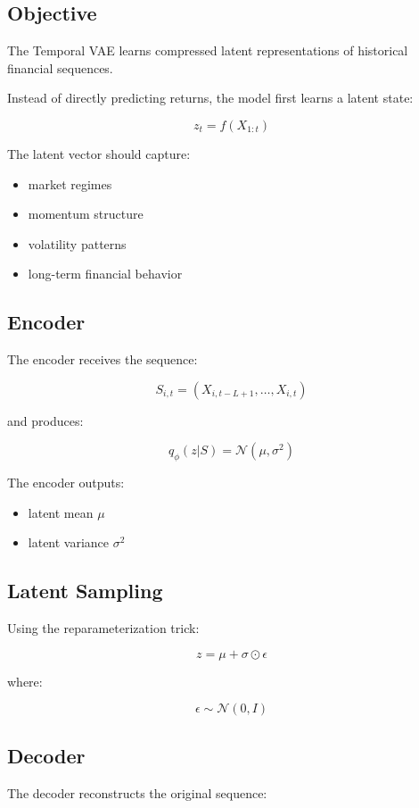 \documentclass[11pt]{article}
\begin{document}
\subsection{Objective}

The Temporal VAE learns compressed latent representations of historical financial sequences.

Instead of directly predicting returns, the model first learns a latent state:

\[
z_t
=
f(X_{1:t})
\]

The latent vector should capture:
\begin{itemize}
    \item market regimes
    \item momentum structure
    \item volatility patterns
    \item long-term financial behavior
\end{itemize}

\subsection{Encoder}

The encoder receives the sequence:

\[
S_{i,t}
=
(X_{i,t-L+1}, \dots, X_{i,t})
\]

and produces:

\[
q_\phi(z|S)
=
\mathcal{N}(\mu, \sigma^2)
\]

The encoder outputs:
\begin{itemize}
    \item latent mean $\mu$
    \item latent variance $\sigma^2$
\end{itemize}

\subsection{Latent Sampling}

Using the reparameterization trick:

\[
z = \mu + \sigma \odot \epsilon
\]

where:

\[
\epsilon \sim \mathcal{N}(0, I)
\]

\subsection{Decoder}

The decoder reconstructs the original sequence:
\end{document}
